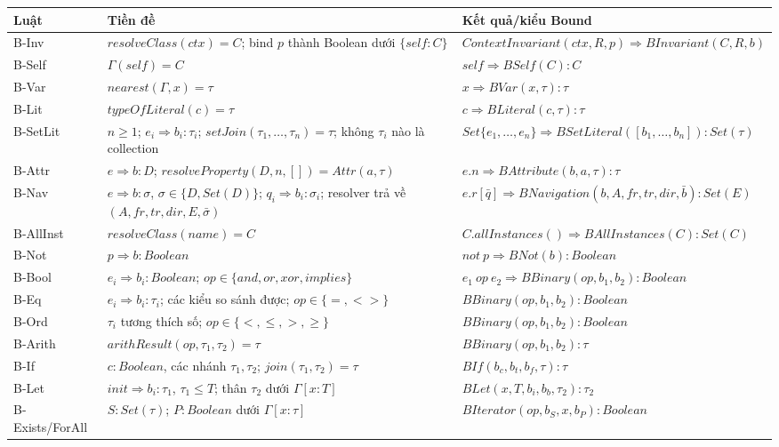 \documentclass[11pt,a4paper]{article}
\theoremstyle{definition}
\begin{document}
\begingroup\small
\begin{longtable}{p{}p{}p{}}
\toprule
Luật & Tiền đề & Kết quả/kiểu Bound\\
\midrule
B-Inv & $resolveClass(ctx)=C$; bind $p$ thành Boolean dưới $\{self:C\}$ &
$ContextInvariant(ctx,R,p)\Rightarrow BInvariant(C,R,b)$\\
B-Self & $\Gamma(self)=C$ & $self\Rightarrow BSelf(C):C$\\
B-Var & $nearest(\Gamma,x)=\tau$ & $x\Rightarrow BVar(x,\tau):\tau$\\
B-Lit & $typeOfLiteral(c)=\tau$ & $c\Rightarrow BLiteral(c,\tau):\tau$\\
B-SetLit & $n\geq1$; $e_i\Rightarrow b_i:\tau_i$; $setJoin(\tau_1,\ldots,\tau_n)=\tau$;
không $\tau_i$ nào là collection & $Set\{e_1,\ldots,e_n\}\Rightarrow BSetLiteral([b_1,\ldots,b_n]):Set(\tau)$\\
B-Attr & $e\Rightarrow b:D$; $resolveProperty(D,n,[])=Attr(a,\tau)$ &
$e.n\Rightarrow BAttribute(b,a,\tau):\tau$\\
B-Nav & $e\Rightarrow b:\sigma$, $\sigma\in\{D,Set(D)\}$;
$q_i\Rightarrow b_i:\sigma_i$; resolver trả về $(A,fr,tr,dir,E,\bar\sigma)$ &
$e.r[\bar q]\Rightarrow BNavigation(b,A,fr,tr,dir,\bar b):Set(E)$\\
B-AllInst & $resolveClass(name)=C$ & $C.allInstances()\Rightarrow BAllInstances(C):Set(C)$\\
B-Not & $p\Rightarrow b:Boolean$ & $not\ p\Rightarrow BNot(b):Boolean$\\
B-Bool & $e_i\Rightarrow b_i:Boolean$; $op\in\{and,or,xor,implies\}$ &
$e_1\ op\ e_2\Rightarrow BBinary(op,b_1,b_2):Boolean$\\
B-Eq & $e_i\Rightarrow b_i:\tau_i$; các kiểu so sánh được; $op\in\{=,<>\}$ &
$BBinary(op,b_1,b_2):Boolean$\\
B-Ord & $\tau_i$ tương thích số; $op\in\{<,\leq,>,\geq\}$ &
$BBinary(op,b_1,b_2):Boolean$\\
B-Arith & $arithResult(op,\tau_1,\tau_2)=\tau$ &
$BBinary(op,b_1,b_2):\tau$\\
B-If & $c:Boolean$, các nhánh $\tau_1,\tau_2$; $join(\tau_1,\tau_2)=\tau$ &
$BIf(b_c,b_t,b_f,\tau):\tau$\\
B-Let & $init\Rightarrow b_i:\tau_1$, $\tau_1\leq T$; thân $\tau_2$ dưới $\Gamma[x:T]$ &
$BLet(x,T,b_i,b_b,\tau_2):\tau_2$\\
B-Exists/ForAll & $S:Set(\tau)$; $P:Boolean$ dưới $\Gamma[x:\tau]$ &
$BIterator(op,b_S,x,b_P):Boolean$\\

\end{longtable}
\end{document}
